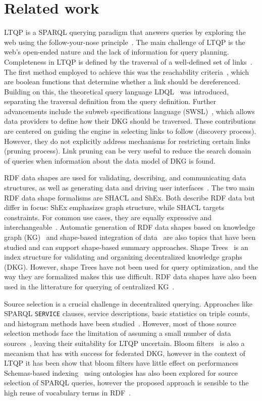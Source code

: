 \section{Related work}

LTQP is a SPARQL querying paradigm that answers queries by exploring the web using the follow-your-nose principle~\cite{hartig2016walking}.
The main challenge of LTQP is the web's open-ended nature and the lack of information for query planning.
Completeness in LTQP is defined by the traversal of a well-defined set of links~\cite{Hartig2012}.
The first method employed to achieve this was the reachability criteria~\cite{Hartig2012}, which are boolean functions that determine whether a link should be dereferenced.
Building on this, the theoretical query language LDQL~\cite{hartigLDQL} was introduced, separating the traversal definition from the query definition.
Further advancements include the subweb specifications language (SWSL)~\cite{Bogaerts2021LinkTW}, which allows data providers to define how their DKG should be traversed.
These contributions are centered on guiding the engine in selecting links to follow (discovery process).
However, they do not explicitly address mechanisms for restricting certain links (pruning process).
Link pruning can be very useful to reduce the search domain of queries when information about the data model of DKG is found.

RDF data shapes are used for validating, describing, and communicating data structures, as well as generating data and driving user interfaces~\cite{Gayo2018a,Gayo2018}.
The two main RDF data shape formalisms are SHACL and ShEx.
Both describe RDF data but differ in focus: ShEx emphasizes graph structure, while SHACL targets constraints.
For common use cases, they are equally expressive and interchangeable~\cite{Gayo2018c}.
Automatic generation of RDF data shapes based on knowledge graph (KG)~\cite{fernandez2023extracting} and shape-based integration of data~\cite{LabraGayo2023} are also topics that have been studied and can support shape-based summary approaches.
Shape Trees~\cite{shapetreesShapeTrees} is an index structure for validating and organizing decentralized knowledge graphs (DKG).
However, shape Trees have not been used for query optimization, and the way they are formalized makes this use difficult.
RDF data shapes have also been used in the litterature for querying of centralized KG~\cite{kashif2021}.

Source selection is a crucial challenge in decentralized querying.
Approaches like SPARQL \texttt{SERVICE} clauses, service descriptions, basic statistics on triple counts, and histogram methods have been studied~\cite{hose2012towards, Harth2010}.
However, most of those source selection methods face the limitation of assuming a small number of data sources~\cite{Harth2010}, leaving their suitability for LTQP uncertain.
Bloom filters~\cite{dia2018fast} is also a mecanism that has with success for federated DKG, however in the context of LTQP it has been show that bloom filters have little effect on performances~\cite{Hanski2024}
Schemas-based indexing~\cite{Stuckenschmidt2004} using ontologies has also been explored for source selection of SPARQL queries,
however the proposed approach is sensible to the high reuse of vocabulary terms in RDF~\cite{Harth2010}.